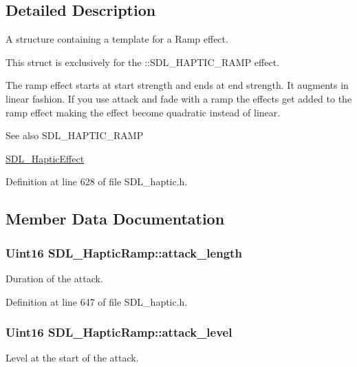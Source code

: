 \subsection{Detailed Description}
A structure containing a template for a Ramp effect. 

This struct is exclusively for the \+::\+S\+D\+L\+\_\+\+H\+A\+P\+T\+I\+C\+\_\+\+R\+A\+M\+P effect.

The ramp effect starts at start strength and ends at end strength. It augments in linear fashion. If you use attack and fade with a ramp the effects get added to the ramp effect making the effect become quadratic instead of linear.

\begin{DoxySeeAlso}{See also}
S\+D\+L\+\_\+\+H\+A\+P\+T\+I\+C\+\_\+\+R\+A\+M\+P 

\hyperlink{unionSDL__HapticEffect}{S\+D\+L\+\_\+\+Haptic\+Effect} 
\end{DoxySeeAlso}


Definition at line 628 of file S\+D\+L\+\_\+haptic.\+h.



\subsection{Member Data Documentation}
\hypertarget{structSDL__HapticRamp_adbcd7ffb05016d442c73e81cc0fcbbd2}{
\subsubsection[{attack\+\_\+length}]{\setlength{\rightskip}{0pt plus 5cm}Uint16 S\+D\+L\+\_\+\+Haptic\+Ramp\+::attack\+\_\+length}}\label{structSDL__HapticRamp_adbcd7ffb05016d442c73e81cc0fcbbd2}
Duration of the attack. 

Definition at line 647 of file S\+D\+L\+\_\+haptic.\+h.

\hypertarget{structSDL__HapticRamp_a755933bbda14ae9b53c574b9fe6291a0}{
\subsubsection[{attack\+\_\+level}]{\setlength{\rightskip}{0pt plus 5cm}Uint16 S\+D\+L\+\_\+\+Haptic\+Ramp\+::attack\+\_\+level}}\label{structSDL__HapticRamp_a755933bbda14ae9b53c574b9fe6291a0}
Level at the start of the attack. 


